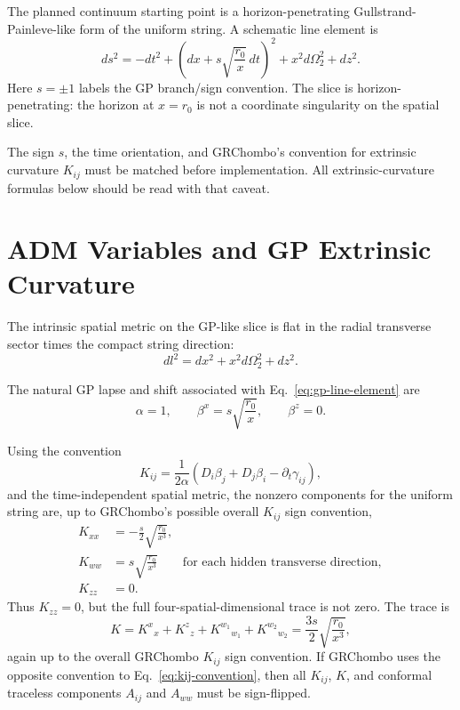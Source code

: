 \documentclass[11pt]{article}
\begin{document}
The planned continuum starting point is a horizon-penetrating
Gullstrand-Painleve-like form of the uniform string. A schematic line element is
\begin{equation}
  ds^2
  =
  -dt^2
  +
  \left(dx + s\sqrt{\frac{r_0}{x}}\,dt\right)^2
  +
  x^2 d\Omega_2^2
  +
  dz^2 .
  \label{eq:gp-line-element}
\end{equation}
Here \(s=\pm 1\) labels the GP branch/sign convention. The slice is
horizon-penetrating: the horizon at \(x=r_0\) is not a coordinate singularity
on the spatial slice.

The sign \(s\), the time orientation, and GRChombo's convention for
extrinsic curvature \(K_{ij}\) must be matched before implementation. All
extrinsic-curvature formulas below should be read with that caveat.

\section{ADM Variables and GP Extrinsic Curvature}

The intrinsic spatial metric on the GP-like slice is flat in the radial
transverse sector times the compact string direction:
\begin{equation}
  dl^2 = dx^2 + x^2 d\Omega_2^2 + dz^2 .
\end{equation}

The natural GP lapse and shift associated with
Eq.~\eqref{eq:gp-line-element} are
\begin{equation}
  \alpha = 1,
  \qquad
  \beta^x = s\sqrt{\frac{r_0}{x}},
  \qquad
  \beta^z = 0 .
  \label{eq:natural-gp-shift}
\end{equation}

Using the convention
\begin{equation}
  K_{ij}
  =
  \frac{1}{2\alpha}
  \left(
    D_i\beta_j + D_j\beta_i - \partial_t \gamma_{ij}
  \right),
  \label{eq:kij-convention}
\end{equation}
and the time-independent spatial metric, the nonzero components for the
uniform string are, up to GRChombo's possible overall \(K_{ij}\) sign
convention,
\begin{align}
  K_{xx}
  &=
  -\frac{s}{2}\sqrt{\frac{r_0}{x^3}},
  \\
  K_{ww}
  &=
  s\sqrt{\frac{r_0}{x^3}}
  \qquad\text{for each hidden transverse direction},
  \\
  K_{zz}
  &= 0 .
\end{align}
Thus \(K_{zz}=0\), but the full four-spatial-dimensional trace is not zero.
The trace is
\begin{equation}
  K
  =
  K^x{}_{x}
  +
  K^z{}_{z}
  +
  K^{w_1}{}_{w_1}
  +
  K^{w_2}{}_{w_2}
  =
  \frac{3s}{2}\sqrt{\frac{r_0}{x^3}},
  \label{eq:k-trace}
\end{equation}
again up to the overall GRChombo \(K_{ij}\) sign convention. If GRChombo uses
the opposite convention to Eq.~\eqref{eq:kij-convention}, then all
\(K_{ij}\), \(K\), and conformal traceless components \(A_{ij}\) and
\(A_{ww}\) must be sign-flipped.
\end{document}
